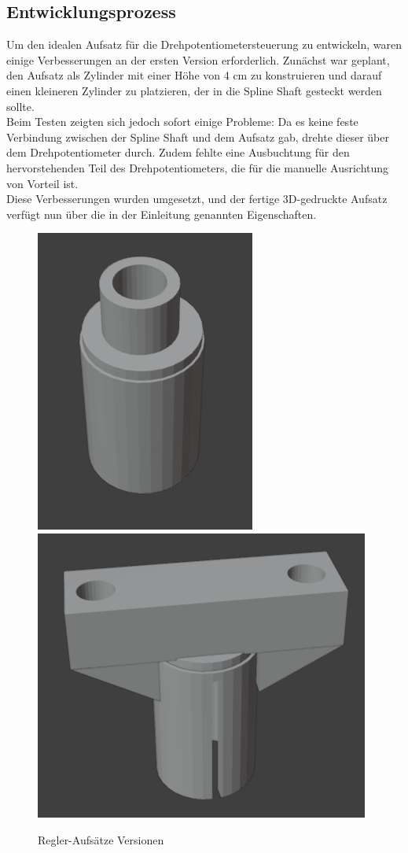 \subsection{Entwicklungsprozess}
Um den idealen Aufsatz für die Drehpotentiometersteuerung zu entwickeln, waren einige Verbesserungen an der ersten Version erforderlich. Zunächst war geplant, den Aufsatz als Zylinder mit einer Höhe von 4 cm zu konstruieren und darauf einen kleineren Zylinder zu platzieren, der in die Spline Shaft gesteckt werden sollte. \\
Beim Testen zeigten sich jedoch sofort einige Probleme: Da es keine feste Verbindung zwischen der Spline Shaft und dem Aufsatz gab, drehte dieser über dem Drehpotentiometer durch. Zudem fehlte eine Ausbuchtung für den hervorstehenden Teil des Drehpotentiometers, die für die manuelle Ausrichtung von Vorteil ist.\\
Diese Verbesserungen wurden umgesetzt, und der fertige 3D-gedruckte Aufsatz verfügt nun über die in der Einleitung genannten Eigenschaften.


\begin{figure}[H]
	\centering
	\includegraphics[width=0.25\linewidth]{images/ReglerV1.png}
	\includegraphics[width=0.398\linewidth]{images/Regler.png}
	\caption[Regler-Aufsätze Versionen]{Regler-Aufsätze Versionen}
	\label{fig:Regler-Aufsätze Versionen}
\end{figure}

\newpage
